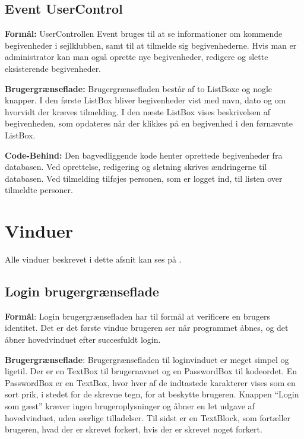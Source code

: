\subsection{Event UserControl}
\textbf{Formål:}
UserControllen Event bruges til at se informationer om kommende begivenheder i sejlklubben, samt til at tilmelde sig begivenhederne. 
Hvis man er administrator kan man også oprette nye begivenheder, redigere og slette eksisterende begivenheder.

\textbf{Brugergrænseflade:}
Brugergrænsefladen består af to ListBoxe og nogle knapper.
I den første ListBox bliver begivenheder vist med navn, dato og om  hvorvidt der kræves tilmelding.
I den næste ListBox vises beskrivelsen af begivenheden, som opdateres når der klikkes på en begivenhed i den førnævnte ListBox. 

\textbf{Code-Behind:}
Den bagvedliggende kode henter oprettede begivenheder fra databasen. 
Ved oprettelse, redigering og sletning skrives ændringerne til databasen. 
Ved tilmelding tilføjes personen, som er logget ind, til listen over tilmeldte personer.

\section{Vinduer}
Alle vinduer beskrevet i dette afsnit kan ses på . 

\subsection{Login brugergrænseflade} 
 
\textbf{Formål}:
Login brugergrænsefladen har til formål at verificere en brugers identitet. 
Det er det første vindue brugeren ser når programmet åbnes, og det åbner hovedvinduet efter succesfuldt login.
 
\textbf{Brugergrænseflade}: 
Brugergrænsefladen til loginvinduet er meget simpel og ligetil.
Der er en TextBox til brugernavnet og en PasswordBox til kodeordet.
En PasswordBox er en TextBox, hvor hver af de indtastede karakterer vises som en sort prik, i stedet for de skrevne tegn, for at beskytte brugeren.
Knappen ``Login som gæst'' kræver ingen brugeroplysninger og åbner en let udgave af hovedvinduet, uden særlige tilladelser.
Til sidst er en TextBlock, som fortæller brugeren, hvad der er skrevet forkert, hvis der er skrevet noget forkert.


